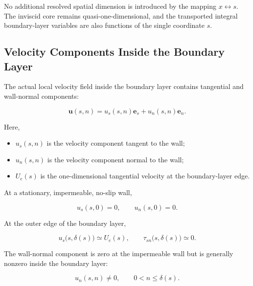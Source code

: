 No additional resolved spatial dimension is introduced by the mapping
\(x\leftrightarrow s\). The inviscid core remains quasi-one-dimensional, and
the transported integral boundary-layer variables are also functions of the
single coordinate \(s\).

\subsection{Velocity Components Inside the Boundary Layer}

The actual local velocity field inside the boundary layer contains tangential
and wall-normal components:

\begin{equation}
    \boxed{
    \boldsymbol{u}(s,n)
    =
    u_s(s,n)\boldsymbol{e}_s
    +
    u_n(s,n)\boldsymbol{e}_n
    }.
    \label{eq:BL_velocity_decomposition}
\end{equation}

Here,

\begin{itemize}
    \item \(u_s(s,n)\) is the velocity component tangent to the wall;
    \item \(u_n(s,n)\) is the velocity component normal to the wall;
    \item \(U_e(s)\) is the one-dimensional tangential velocity at the
    boundary-layer edge.
\end{itemize}

At a stationary, impermeable, no-slip wall,

\begin{equation}
    \boxed{
    u_s(s,0)=0,
    \qquad
    u_n(s,0)=0
    }.
    \label{eq:BL_wall_conditions}
\end{equation}

At the outer edge of the boundary layer,

\begin{equation}
    u_s\bigl(s,\delta(s)\bigr)\simeq U_e(s),
    \qquad
    \tau_{sn}\bigl(s,\delta(s)\bigr)\simeq0.
    \label{eq:BL_edge_conditions}
\end{equation}

The wall-normal component is zero at the impermeable wall but is generally
nonzero inside the boundary layer:

\begin{equation}
    u_n(s,n)\neq0,
    \qquad
    0<n\leq\delta(s).
    \label{eq:normal_velocity_nonzero}
\end{equation}


